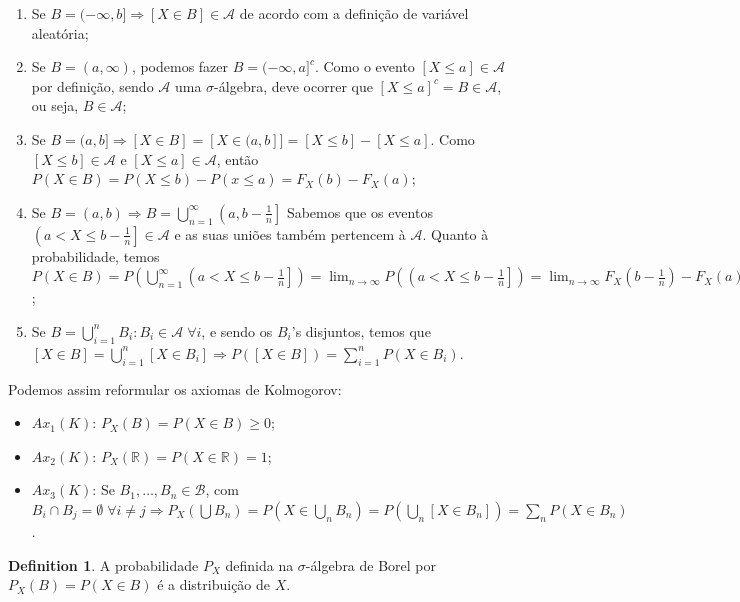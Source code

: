 \documentclass[
]{article}
\providecommand{\tightlist}{%
  \setlength{\itemsep}{0pt}\setlength{\parskip}{0pt}}
\theoremstyle{definition}
\newtheorem{definition}{Definition}[section]
\theoremstyle{definition}
\theoremstyle{definition}
\theoremstyle{definition}
\theoremstyle{remark}
\begin{document}
\begin{enumerate}
\def\labelenumi{\arabic{enumi}.}
\tightlist
\item
  Se \(B = (-\infty, b] \Rightarrow [X \in B] \in \mathcal{A}\) de acordo com a definição de variável aleatória;
\item
  Se \(B = (a, \infty)\), podemos fazer \(B = (-\infty, a]^{c}\). Como o evento \([X \le a] \in \mathcal{A}\) por definição, sendo \(\mathcal{A}\) uma \(\sigma\)-álgebra, deve ocorrer que \([X \le a]^{c} = B \in \mathcal{A}\), ou seja, \(B \in \mathcal{A}\);
\item
  Se \(B = (a, b] \Rightarrow [X \in B] = [X \in (a,b]] = [X \le b] - [X \le a]\). Como \([X \le b] \in \mathcal{A}\) e \([X \le a] \in \mathcal{A}\), então \(P(X \in B) = P(X \le b) - P(x \le a) = F_{X}(b) - F_{X}(a)\);
\item
  Se \(B = (a,b) \Rightarrow B = \bigcup_{n=1}^{\infty}\left(a,b-\frac{1}{n}\right]\) Sabemos que os eventos \(\left(a < X \le b - \frac{1}{n}\right] \in \mathcal{A}\) e as suas uniões também pertencem à \(\mathcal{A}\). Quanto à probabilidade, temos \(P(X \in B) = P\left(\bigcup_{n=1}^{\infty}\left(a < X \le b - \frac{1}{n}\right]\right) = \lim_{n \to \infty}P\left(\left(a < X \le b - \frac{1}{n}\right]\right) = \lim_{n \to \infty}F_{X}\left(b - \frac{1}{n}\right) - F_{X}(a) = F_{X}(b^{-}) - F_{X}(a)\);
\item
  Se \(B = \bigcup_{i = 1}^{n}B_{i}:B_{i} \in \mathcal{A}\; \forall i\), e sendo os \(B_{i}\)'s disjuntos, temos que \([X \in B] = \bigcup_{i=1}^{n}[X \in B_{i}] \Rightarrow P([X \in B]) = \sum_{i=1}^{n}P(X \in B_{i})\).
\end{enumerate}

Podemos assim reformular os axiomas de Kolmogorov:

\begin{itemize}
\tightlist
\item
  \(Ax_{1}(K)\): \(P_{X}(B) = P(X \in B) \ge 0\);
\item
  \(Ax_{2}(K)\): \(P_{X}(\mathbb{R}) = P(X \in \mathbb{R}) = 1\);
\item
  \(Ax_{3}(K)\): Se \(B_{1}, \ldots, B_{n} \in \mathcal{B}\), com \(B_{i} \cap B_{j} = \emptyset \; \forall i \neq j \Rightarrow P_{X}(\bigcup B_{n}) = P(X \in \bigcup_{n}B_{n}) = P(\bigcup_{n}[X \in B_{n}]) = \sum_{n}P(X \in B_{n})\).
\end{itemize}

\begin{definition}
A probabilidade \(P_{X}\) definida na \(\sigma\)-álgebra de Borel por \(P_{X}(B) = P(X \in B)\) é a distribuição de \(X\).
\end{definition}
\end{document}

